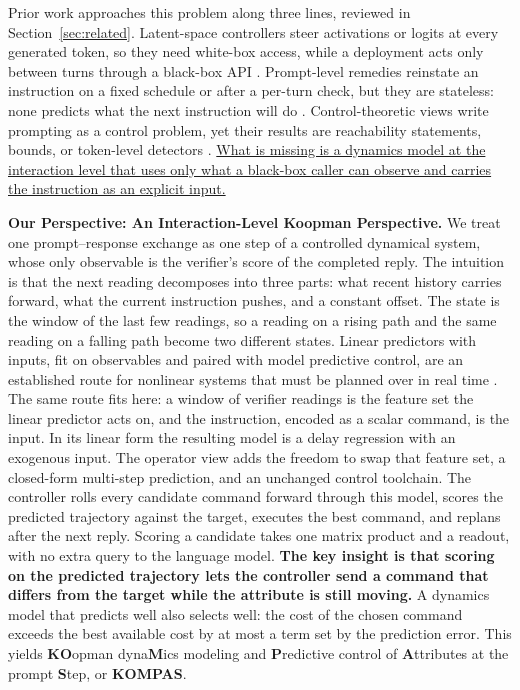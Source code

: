 Prior work approaches this problem along three lines, reviewed in Section~\ref{sec:related}.
Latent-space controllers steer activations or logits at every generated token, so they need white-box access, while a deployment acts only between turns through a black-box API \citep{nguyen2026pidsteering, miyaoka2024cbfllm, tran2026barriersteer, hu2025nbfllm, cheng2024liseco, skifstad2026alqr, kong2024recontrol}.
Prompt-level remedies reinstate an instruction on a fixed schedule or after a per-turn check, but they are stateless: none predicts what the next instruction will do \citep{li2024instability, dongre2025driftnomore, wang2026nautilus}.
Control-theoretic views write prompting as a control problem, yet their results are reachability statements, bounds, or token-level detectors \citep{bhargava2023magicword, cheng2026genctrl, fan2026steerable, akrout2026distinguishability}.
\uline{What is missing is a dynamics model at the interaction level that uses only what a black-box caller can observe and carries the instruction as an explicit input.}

\textbf{Our Perspective: An Interaction-Level Koopman Perspective.}
We treat one prompt--response exchange as one step of a controlled dynamical system, whose only observable is the verifier's score of the completed reply.
The intuition is that the next reading decomposes into three parts: what recent history carries forward, what the current instruction pushes, and a constant offset.
The state is the window of the last few readings, so a reading on a rising path and the same reading on a falling path become two different states.
Linear predictors with inputs, fit on observables and paired with model predictive control, are an established route for nonlinear systems that must be planned over in real time \citep{korda2018koopman}.
The same route fits here: a window of verifier readings is the feature set the linear predictor acts on, and the instruction, encoded as a scalar command, is the input.
In its linear form the resulting model is a delay regression with an exogenous input. The operator view adds the freedom to swap that feature set, a closed-form multi-step prediction, and an unchanged control toolchain.
The controller rolls every candidate command forward through this model, scores the predicted trajectory against the target, executes the best command, and replans after the next reply.
Scoring a candidate takes one matrix product and a readout, with no extra query to the language model.
\textbf{The key insight is that scoring on the predicted trajectory lets the controller send a command that differs from the target while the attribute is still moving.}
A dynamics model that predicts well also selects well: the cost of the chosen command exceeds the best available cost by at most a term set by the prediction error.
This yields \textbf{KO}opman dyna\textbf{M}ics modeling and \textbf{P}redictive control of \textbf{A}ttributes at the prompt \textbf{S}tep, or \textbf{KOMPAS}.

